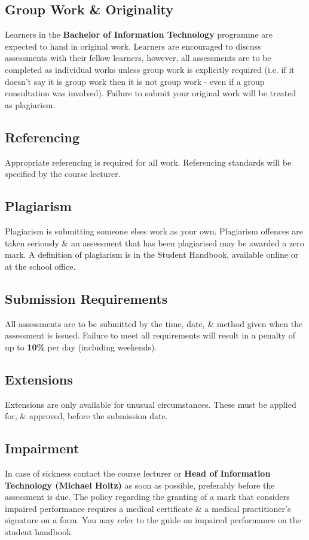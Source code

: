 \documentclass{article}
\begin{document}
\subsection*{Group Work \& Originality}
Learners in the \textbf{Bachelor of Information Technology} programme are expected to hand in original work. Learners are encouraged to discuss assessments with their fellow learners, however, all assessments are to be completed as individual works unless group work is explicitly required (i.e. if it doesn't say it is group work then it is not group work - even if a group consultation was involved). Failure to submit your original work will be treated as plagiarism.

\subsection*{Referencing}
Appropriate referencing is required for all work. Referencing standards will be specified by the course lecturer.

\subsection*{Plagiarism}
Plagiarism is submitting someone elses work as your own. Plagiarism offences are taken seriously \& an assessment that has been plagiarised may be awarded a zero mark. A definition of plagiarism is in the Student Handbook, available online or at the school office.

\subsection*{Submission Requirements}
All assessments are to be submitted by the time, date, \& method given when the assessment is issued. Failure to meet all requirements will result in a penalty of up to \textbf{10\%} per day (including weekends).

\subsection*{Extensions}
Extensions are only available for unusual circumstances. These must be applied for, \& approved, before the submission date.

\subsection*{Impairment}
In case of sickness contact the course lecturer or \textbf{Head of Information Technology (Michael Holtz)} as soon as possible, preferably before the assessment is due. The policy regarding the granting of a mark that considers impaired performance requires a medical certificate \& a medical practitioner’s signature on a form. You may refer to the guide on impaired performance on the student handbook.
\end{document}
